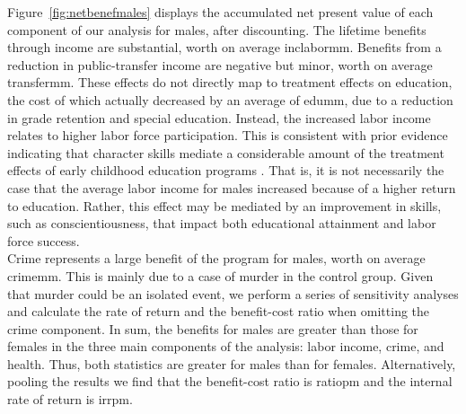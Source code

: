 \noindent Figure~\ref{fig:netbenefmales} displays the accumulated net present value of each component of our analysis for males, after discounting. The lifetime benefits through income are substantial, worth on average inclabormm. Benefits from a reduction in public-transfer income are negative but minor, worth on average transfermm.  These effects do not directly map to treatment effects on education, the cost of which actually decreased by an average of edumm, due to a reduction in grade retention and special education. Instead, the increased labor income relates to higher labor force participation. This is consistent with prior evidence indicating that character skills mediate a considerable amount of the treatment effects of early childhood education programs \citep[see][]{Heckman_Pinto_etal_2013_PerryFactor}. That is, it is not necessarily the case that the average labor income for males increased because of a higher return to education. Rather, this effect may be mediated by an improvement in skills, such as conscientiousness, that impact both educational attainment and labor force success.\\ 

\noindent Crime represents a large benefit of the program for males, worth on average crimemm. This is mainly due to a case of murder in the control group. Given that murder could be an isolated event, we perform a series of sensitivity analyses and calculate the rate of return and the benefit-cost ratio when omitting the crime component. In sum, the benefits for males are greater than those for females in the three main components of the analysis: labor income, crime, and health. Thus, both statistics are greater for males than for females. Alternatively, pooling the results we find that the benefit-cost ratio is ratiopm and the internal rate of return is irrpm. \\

